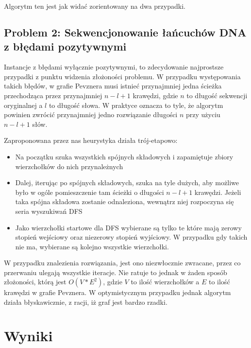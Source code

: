 \documentclass[a4paper]{article}
\begin{document}
Algorytm ten jest jak widać zorientowany na dwa przypadki. %

\subsection{Problem 2: Sekwencjonowanie łańcuchów DNA z błędami pozytywnymi}
Instancje z błędami wyłącznie pozytywnymi, to zdecydowanie najprostsze przypadki z punktu widzenia złożoności problemu.
W przypadku występowania takich błędów, w grafie Pevznera musi istnieć przynajmniej jedna ścieżka przechodząca przez
przynajmniej $n-l+1$ krawędzi, gdzie $n$ to długość sekwencji oryginalnej a $l$ to długość słowa. W praktyce oznacza to tyle,
że algorytm powinien zwrócić przynajmniej jedno rozwiązanie długości $n$ przy użyciu $n-l+1$ słów.

Zaproponowana przez nas heurystyka działa trój-etapowo:
\begin{itemize}
\item Na początku szuka wszystkich spójnych składowych i zapamiętuje zbiory wierzchołków do nich przynależnych
\item Dalej, iterując po spójnych składowych, szuka na tyle dużych, aby możliwe było w ogóle pomieszczenie tam ścieżki
o długości $n-l+1$ krawędzi. Jeżeli taka spójna składowa zostanie odnaleziona, wewnątrz niej rozpoczyna się seria
wyszukiwań DFS
\item Jako wierzchołki startowe dla DFS wybierane są tylko te które mają zerowy stopień wejściowy oraz niezerowy
stopień wyjściowy. W przypadku gdy takich nie ma, wybierane są kolejno wszystkie wierzchołki.
\end{itemize}

W przypadku znalezienia rozwiązania, jest ono niezwłocznie zwracane, przez co przerwaniu ulegają wszystkie iteracje.
Nie ratuje to jednak w żaden sposób złożoności, którą jest $O(V*E^2)$, gdzie $V$ to ilość wierzchołków a $E$ to ilość
krawędzi w grafie Pevznera. W optymistycznym przypadku jednak algorytm działa błyskawicznie, z racji, iż graf jest
bardzo rzadki.

\section{Wyniki}
\end{document}
